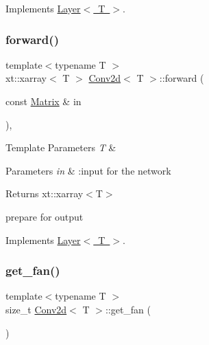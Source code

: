 Implements \mbox{\hyperlink{class_layer_ac4c13a3a85bfdd4d7d4d18669e3299fe}{Layer$<$ T $>$}}.

\mbox{\label{class_conv2d_ab795f6a1cabcfedfb2fcb55c9389c2fe}} 
\subsubsection{\texorpdfstring{forward()}{forward()}}
{\footnotesize\ttfamily template$<$typename T $>$ \\
xt\+::xarray$<$ T $>$ \mbox{\hyperlink{class_conv2d}{Conv2d}}$<$ T $>$\+::forward (\begin{DoxyParamCaption}\item[{const \mbox{\hyperlink{class_conv2d_a8263e2f2c46243e39fbca5712603c0fd}{Matrix}} \&}]{in }\end{DoxyParamCaption})\hspace{0.3cm}{\ttfamily [override]}, {\ttfamily [virtual]}}


\begin{DoxyTemplParams}{Template Parameters}
{\em T} & \\
\hline
\end{DoxyTemplParams}

\begin{DoxyParams}{Parameters}
{\em in} & \+:input for the network \\
\hline
\end{DoxyParams}
\begin{DoxyReturn}{Returns}
xt\+::xarray$<$\+T$>$ 
\end{DoxyReturn}
prepare for output

Implements \mbox{\hyperlink{class_layer_ab15b665c86974b1cf1d7ba4e309cb0e5}{Layer$<$ T $>$}}.

\mbox{\label{class_conv2d_a6eeedff6c4d0864a4c3788e06e82a2e4}} 
\subsubsection{\texorpdfstring{get\_fan()}{get\_fan()}}
{\footnotesize\ttfamily template$<$typename T $>$ \\
size\+\_\+t \mbox{\hyperlink{class_conv2d}{Conv2d}}$<$ T $>$\+::get\+\_\+fan (\begin{DoxyParamCaption}{ }\end{DoxyParamCaption})\hspace{0.3cm}{\ttfamily [virtual]}}



